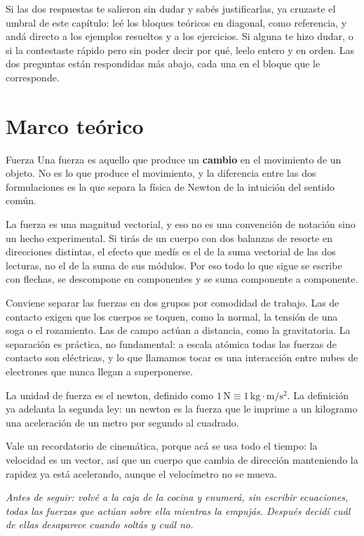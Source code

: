 \documentclass[11pt,openany]{book}
\begin{document}
Si las dos respuestas te salieron sin dudar y sabés justificarlas, ya cruzaste el umbral de este capítulo: leé los bloques teóricos en diagonal, como referencia, y andá directo a los ejemplos resueltos y a los ejercicios. Si alguna te hizo dudar, o si la contestaste rápido pero sin poder decir por qué, leelo entero y en orden. Las dos preguntas están respondidas más abajo, cada una en el bloque que le corresponde.

\section{Marco teórico}

\begin{bloque}{Fuerza}
Una fuerza es aquello que produce un \textbf{cambio} en el movimiento de un objeto. No es lo que produce el movimiento, y la diferencia entre las dos formulaciones es la que separa la física de Newton de la intuición del sentido común.

La fuerza es una magnitud vectorial, y eso no es una convención de notación sino un hecho experimental. Si tirás de un cuerpo con dos balanzas de resorte en direcciones distintas, el efecto que medís es el de la suma vectorial de las dos lecturas, no el de la suma de sus módulos. Por eso todo lo que sigue se escribe con flechas, se descompone en componentes y se suma componente a componente.

Conviene separar las fuerzas en dos grupos por comodidad de trabajo. Las de contacto exigen que los cuerpos se toquen, como la normal, la tensión de una soga o el rozamiento. Las de campo actúan a distancia, como la gravitatoria. La separación es práctica, no fundamental: a escala atómica todas las fuerzas de contacto son eléctricas, y lo que llamamos tocar es una interacción entre nubes de electrones que nunca llegan a superponerse.

La unidad de fuerza es el newton, definido como $1\,\mathrm{N} \equiv 1\,\mathrm{kg\cdot m/s^2}$. La definición ya adelanta la segunda ley: un newton es la fuerza que le imprime a un kilogramo una aceleración de un metro por segundo al cuadrado.

Vale un recordatorio de cinemática, porque acá se usa todo el tiempo: la velocidad es un vector, así que un cuerpo que cambia de dirección manteniendo la rapidez ya está acelerando, aunque el velocímetro no se mueva.

\textit{Antes de seguir: volvé a la caja de la cocina y enumerá, sin escribir ecuaciones, todas las fuerzas que actúan sobre ella mientras la empujás. Después decidí cuál de ellas desaparece cuando soltás y cuál no.}
\end{bloque}
\end{document}

